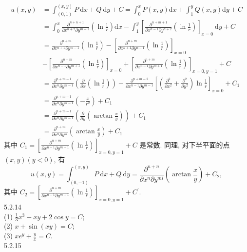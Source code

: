 \documentclass[a4paper,11pt,UTF8]{article}
\begin{document}
$$
\begin{aligned}
	u(x, y) & =\int_{(0,1)}^{(x, y)} P \mathrm{~d} x+Q \mathrm{~d} y+C=\int_0^x P(x, y) \mathrm{d} x+\int_1^y Q(x, y) \mathrm{d} y+C \\
	& =\int_0^x \frac{\partial^{n+n+1}}{\partial x^{n+2} \partial y^{m-1}}\left(\ln \frac{1}{r}\right) \mathrm{d} x-\int_1^y\left[\frac{\partial^{n+m+1}}{\partial x^{n-1} \partial y^{n+2}}\left(\ln \frac{1}{r}\right)\right]_{x=0} \mathrm{~d} y+C \\
	& =\frac{\partial^{n+m}}{\partial x^{n+1} \partial y^{m-1}}\left(\ln \frac{1}{r}\right)-\left[\frac{\partial^{n+m}}{\partial x^{n+1} \partial y^{n-1}}\left(\ln \frac{1}{r}\right)\right]_{x=0} \\
	& -\left[\frac{\partial^{n-m}}{\partial x^{n-1} \partial y^{m+1}}\left(\ln \frac{1}{r}\right)\right]_{x=0}+\left[\frac{\partial^{n+m}}{\partial x^{n-1} \partial y^{m+1}}\left(\ln \frac{1}{r}\right)\right]_{x=0, y=1}+C \\
	& =\frac{\partial^{n+m-1}}{\partial x^n \partial y^{m-1}}\left(\frac{\partial}{\partial x}\left(\ln \frac{1}{r}\right)\right)-\frac{\partial^{n+m-2}}{\partial x^{n-1} \partial y^{m-1}}\left[\left(\frac{\partial^2}{\partial x^2}+\frac{\partial^2}{\partial y^2}\right) \ln \frac{1}{r}\right]_{x=0}+C_1 \\
	& =\frac{\partial^{n+m-1}}{\partial x^n \partial y^{m-1}}\left(-\frac{x}{r^2}\right)+C_1 \\
	& =\frac{\partial^{n+m-1}}{\partial x^n \partial y^{m-1}}\left(\frac{\partial}{\partial y}\left(\arctan \frac{x}{y}\right)\right)+C_1 \\
	& =\frac{\partial^{n+m}}{\partial x^n \partial y^m}\left(\arctan \frac{x}{y}\right)+C_1
\end{aligned}
$$
其中 $C_1=\left[\frac{\partial^{n+m}}{\partial x^{n-1} \partial y^{m+1}}\left(\ln \frac{1}{r}\right)\right]_{x=0, y=1}+C$ 是常数.
同理, 对下半平面的点 $(x, y)(y<0)$, 有
$$
u(x, y)=\int_{(0,-1)}^{(x, y)} P \mathrm{~d} x+Q \mathrm{~d} y=\frac{\partial^{n+n}}{\partial x^n \partial y^{m i}}\left(\arctan \frac{x}{y}\right)+C_2,
$$
其中 $C_2=\left[\frac{\partial^{n+m}}{\partial x^{n-1} \partial y^{m+1}}\left(\ln \frac{1}{r}\right)\right]_{x=0, y=1}+C^{\prime}$.\\
5.2.14\\
(1) $\frac{1}{3} x^3-x y+2 \cos y=C$;\\
(2) $x+\sin (x y)=C$;\\
(3) $x e^y+\frac{y}{x}=C$.\\
5.2.15\\
\end{document}
